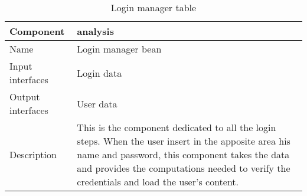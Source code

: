 \begin{flushleft}
	
	\begin{table}[htp]
		
		\begin{tabular}{l|p{7cm}}
			Component&analysis\\
			\hline
			\hline
			Name&Login manager bean\\
			\hline
			Input interfaces& Login data \\
			\hline
			Output interfaces& User data \\
			\hline
			Description&This is the component dedicated to all the login steps. When the user insert in the apposite area his name and password, this component takes the data and provides the computations needed to verify the credentials and load the user's content. \\
			\hline
			
		\end{tabular}
		
		\caption{Login manager table } 
		\label{tab:loginmanagertable}
		
	\end{table}
	
\end{flushleft}

